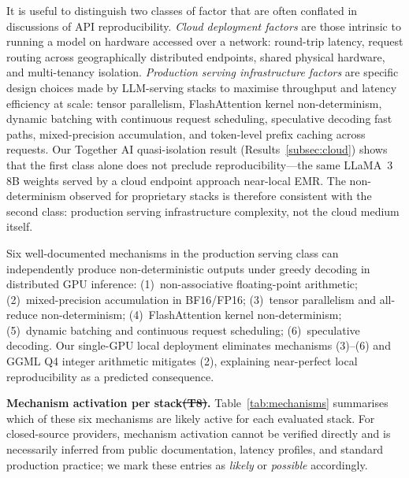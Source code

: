 \documentclass[sn-nature]{sn-jnl}
\makeatletter
\providecommand{\DIFdel}[1]{{\protect\color{red}\sout{#1}}} %
\providecommand{\DIFdelbegin}{} %
\providecommand{\DIFdelend}{} %
\providecommand{\DIFscaledelfig}{0.5}
\newlength{\DIFdelgraphicswidth} %
\newlength{\DIFdelgraphicsheight} %
\providecommand{\DIFdelincludegraphics}[2][]{%
\sbox{\DIFdelgraphicsbox}{\DIFOincludegraphics[#1]{#2}}%
\settoboxwidth{\DIFdelgraphicswidth}{\DIFdelgraphicsbox} %
\settoboxtotalheight{\DIFdelgraphicsheight}{\DIFdelgraphicsbox} %
\scalebox{\DIFscaledelfig}{%
\parbox[b]{\DIFdelgraphicswidth}{\usebox{\DIFdelgraphicsbox}\\[-\baselineskip] \rule{\DIFdelgraphicswidth}{0em}}\llap{\resizebox{\DIFdelgraphicswidth}{\DIFdelgraphicsheight}{%
\setlength{\unitlength}{\DIFdelgraphicswidth}%
\begin{picture}(1,1)%
\thicklines\linethickness{2pt} %
{\color[rgb]{1,0,0}\put(0,0){\framebox(1,1){}}}%
{\color[rgb]{1,0,0}\put(0,0){\line( 1,1){1}}}%
{\color[rgb]{1,0,0}\put(0,1){\line(1,-1){1}}}%
\end{picture}%
}\hspace*{3pt}}} %
} %
\DeclareRobustCommand{\DIFdelbegin}{\DIFOdelbegin \let\includegraphics\DIFdelincludegraphics} %
\DeclareRobustCommand{\DIFdelend}{\DIFOaddend \let\includegraphics\DIFOincludegraphics} %
\let\sout@orig\sout %
\renewcommand{\sout}[1]{\ifmmode\text{\sout@orig{\ensuremath{#1}}}\else\sout@orig{#1}\fi} %
\makeatother
\begin{document}
It is useful to distinguish two classes of factor that are often conflated in discussions of API reproducibility.
\emph{Cloud deployment factors} are those intrinsic to running a model on hardware accessed over a network: round-trip latency, request routing across geographically distributed endpoints, shared physical hardware, and multi-tenancy isolation.
\emph{Production serving infrastructure factors} are specific design choices made by LLM-serving stacks to maximise throughput and latency efficiency at scale: tensor parallelism, FlashAttention kernel non-determinism, dynamic batching with continuous request scheduling, speculative decoding fast paths, mixed-precision accumulation, and token-level prefix caching across requests.
Our Together AI quasi-isolation result (Results~\ref{subsec:cloud}) shows that the first class alone does not preclude reproducibility---the same LLaMA~3 8B weights served by a cloud endpoint approach near-local EMR.
The non-determinism observed for proprietary stacks is therefore consistent with the second class: production serving infrastructure complexity, not the cloud medium itself.

Six well-documented mechanisms in the production serving class can independently produce non-deterministic outputs under greedy decoding in distributed GPU inference:
(1)~non-associative floating-point arithmetic\cite{higham2002accuracy};
(2)~mixed-precision accumulation in BF16/FP16\cite{yuan2025nondeterminism};
(3)~tensor parallelism and all-reduce non-determinism\cite{shoeybi2019megatron};
(4)~FlashAttention kernel non-determinism\cite{dao2022flashattention};
(5)~dynamic batching and continuous request scheduling\cite{kwon2023vllm};
(6)~speculative decoding\cite{leviathan2023speculative}.
Our single-GPU local deployment eliminates mechanisms (3)--(6) and GGML Q4 integer arithmetic mitigates (2), explaining near-perfect local reproducibility as a predicted consequence.

\textbf{Mechanism activation per stack\DIFdelbegin \DIFdel{(T8)}\DIFdelend .}
Table~\ref{tab:mechanisms} summarises which of these six mechanisms are likely active for each evaluated stack.
For closed-source providers, mechanism activation cannot be verified directly and is necessarily inferred from public documentation, latency profiles, and standard production practice; we mark these entries as \emph{likely} or \emph{possible} accordingly.
\end{document}
